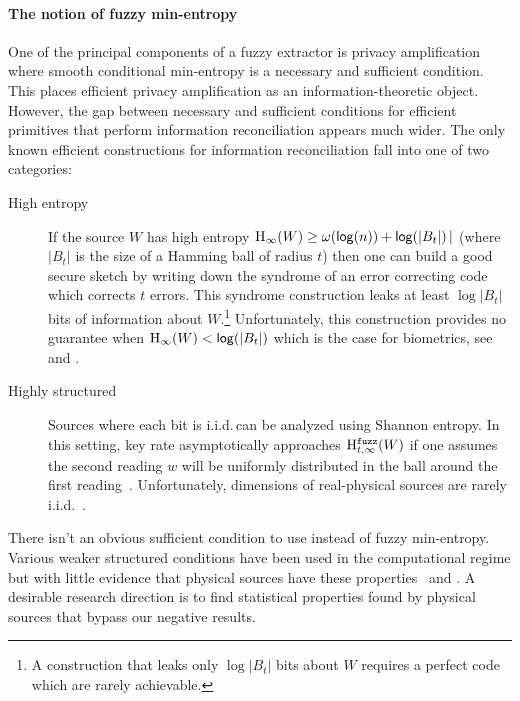 \paragraph{The notion of fuzzy min-entropy}
One of the principal components of a fuzzy extractor is privacy amplification where smooth conditional min-entropy is a necessary and sufficient condition.  This places efficient privacy amplification as an information-theoretic object.  However, the gap between necessary and sufficient conditions for efficient primitives that perform information reconciliation appears much wider. The only known efficient constructions for information reconciliation fall into one of two categories:
\begin{description}
\item[High entropy] If the source $W$ has high entropy $\mathrm{H}_\infty(W)\ge \omega(\mathsf{log}\!\left(n\right)) + \mathsf{log}\!\left(|B_t|\right)|$ (where $|B_t|$ is the size of a Hamming ball of radius $t$) then one can build a good secure sketch by writing down the syndrome of an error correcting code which corrects $t$ errors.  This syndrome construction  leaks at least $\log{|B_t|}$ bits of information about $W$.\footnote{A construction that leaks only $\log{|B_t|}$ bits about $W$ requires a perfect code which are rarely achievable.}  Unfortunately, this construction provides no guarantee when $\mathrm{H}_\infty(W)< \mathsf{log}\!\left(|B_t|\right)$ which is the case for biometrics, see \cite[Proposition 1]{canetti2021reusable} and \cite[Introduction]{simhadri2019cryptographic}.
\item[Highly structured] Sources where each bit is i.i.d.\,can be analyzed using Shannon entropy.  In this setting, key rate asymptotically approaches $\mathrm{H}^{\mathtt{fuzz}}_{t,\infty}(W)$ if one assumes the second reading $w$ will be uniformly distributed in the ball around the first reading~\cite[Theorem 2]{tuyls2004capacity}.  Unfortunately, dimensions of real-physical sources are rarely i.i.d.~\cite{daugman2004}.
\end{description}

There isn't an obvious sufficient condition to use instead of fuzzy min-entropy.  Various weaker structured conditions have been used in the computational regime but with little evidence that physical sources have these properties~\cite[Figure 1]{demarest2021code} and \cite{simhadri2019cryptographic}. A desirable research direction is to find statistical properties found by physical sources that bypass our negative results. 

